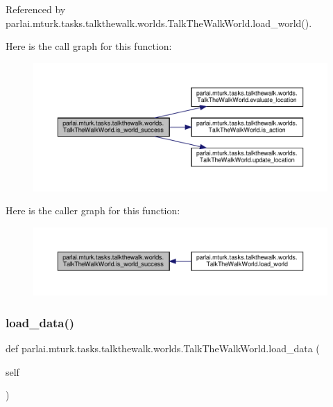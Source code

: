 Referenced by parlai.\+mturk.\+tasks.\+talkthewalk.\+worlds.\+Talk\+The\+Walk\+World.\+load\+\_\+world().

Here is the call graph for this function\+:
\nopagebreak
\begin{figure}[H]
\begin{center}
\leavevmode
\includegraphics[width=350pt]{classparlai_1_1mturk_1_1tasks_1_1talkthewalk_1_1worlds_1_1TalkTheWalkWorld_ae43f66ea3849c1b8015132e53d1a617b_cgraph}
\end{center}
\end{figure}
Here is the caller graph for this function\+:
\nopagebreak
\begin{figure}[H]
\begin{center}
\leavevmode
\includegraphics[width=350pt]{classparlai_1_1mturk_1_1tasks_1_1talkthewalk_1_1worlds_1_1TalkTheWalkWorld_ae43f66ea3849c1b8015132e53d1a617b_icgraph}
\end{center}
\end{figure}
\mbox{\label{classparlai_1_1mturk_1_1tasks_1_1talkthewalk_1_1worlds_1_1TalkTheWalkWorld_a97f6a127548df0b16c669ea71b981c16}} 
\subsubsection{\texorpdfstring{load\+\_\+data()}{load\_data()}}
{\footnotesize\ttfamily def parlai.\+mturk.\+tasks.\+talkthewalk.\+worlds.\+Talk\+The\+Walk\+World.\+load\+\_\+data (\begin{DoxyParamCaption}\item[{}]{self }\end{DoxyParamCaption})}

